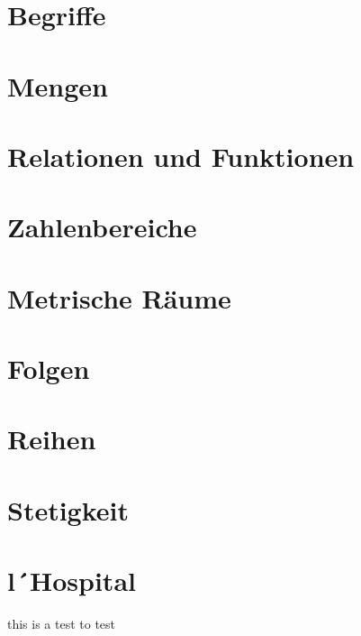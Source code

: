 \documentclass[final, 12pt]{article}
\begin{document}
  

\section{Begriffe}


\section{Mengen}


\section{Relationen und Funktionen}


\section{Zahlenbereiche}


\section{Metrische Räume}


\section{Folgen}


\section{Reihen}


\section{Stetigkeit}


\section{l´Hospital}


this is a test to test

\newpage
\end{document}
